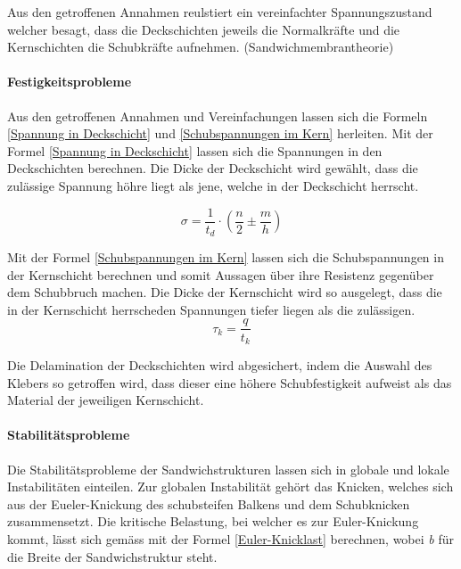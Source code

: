     Aus den getroffenen Annahmen reulstiert ein vereinfachter Spannungszustand welcher besagt, dass die Deckschichten jeweils die Normalkräfte und die Kernschichten die Schubkräfte aufnehmen. (Sandwichmembrantheorie)

    \paragraph{Festigkeitsprobleme}
    Aus den getroffenen Annahmen und Vereinfachungen lassen sich die Formeln \ref{Spannung in Deckschicht} und \ref{Schubspannungen im Kern} herleiten. Mit der Formel \ref{Spannung in Deckschicht} lassen sich die Spannungen in den Deckschichten berechnen. Die Dicke der Deckschicht wird gewählt, dass die zulässige Spannung höhre liegt als jene, welche in der Deckschicht herrscht.

    \begin{equation}
      \label{Spannung in Deckschicht}
      \sigma = \frac{1}{t_d}\cdot \left ( \frac{n}{2} \pm \frac{m}{h}\right )
    \end{equation}

    Mit der Formel \ref{Schubspannungen im Kern} lassen sich die Schubspannungen in der Kernschicht berechnen und somit Aussagen über ihre Resistenz gegenüber dem Schubbruch machen. Die Dicke der Kernschicht wird so ausgelegt, dass die in der Kernschicht herrscheden Spannungen tiefer liegen als die zulässigen.
    \begin{equation}
      \label{Schubspannungen im Kern}
      \tau_k = \frac{q}{t_k}
    \end{equation}

    Die Delamination der Deckschichten wird abgesichert, indem die Auswahl des Klebers so getroffen wird, dass dieser eine höhere Schubfestigkeit aufweist als das Material der jeweiligen Kernschicht.

    \paragraph{Stabilitätsprobleme}
    Die Stabilitätsprobleme der Sandwichstrukturen lassen sich in globale und lokale Instabilitäten einteilen. Zur globalen Instabilität gehört das Knicken, welches sich aus der Eueler-Knickung des schubsteifen Balkens und dem Schubknicken zusammensetzt. Die kritische Belastung, bei welcher es zur Euler-Knickung kommt, lässt sich gemäss \cite{ETH} mit der Formel \ref{Euler-Knicklast} berechnen, wobei \emph{b} für die Breite der Sandwichstruktur steht.

